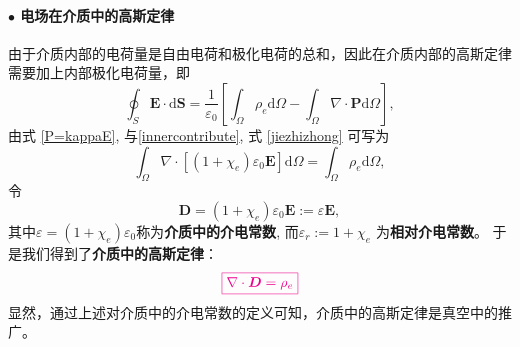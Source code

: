 \documentclass[10pt,reqno, final]{ctexart}
\begin{document}
\paragraph{$\bullet$ 电场在介质中的高斯定律} 由于介质内部的电荷量是自由电荷和极化电荷的总和，因此在介质内部的高斯定律需要加上内部极化电荷量，即
\begin{equation}\label{jiezhizhong}
\oint_S \bm{E}\cdot \mathrm{d}\bm{S} = \frac{1}{\varepsilon_0}\left[ \int_\Omega \rho_e \mathrm{d}\Omega-\int_\Omega \nabla\cdot\bm{P} \mathrm{d}\Omega \right],
\end{equation} 
由式 	\eqref{P=kappaE}, 与\eqref{innercontribute}, 式	\eqref{jiezhizhong} 可写为
\begin{equation}
\int_{\Omega} \nabla\cdot[(1+\chi_e)\varepsilon_0\bm{E}]\mathrm{d}\Omega = \int_\Omega \rho_e \mathrm{d}\Omega,
\end{equation}
令 
$$\bm{D} = (1+\chi_e)\varepsilon_0\bm{E}:= \varepsilon \bm{E},$$
其中$\varepsilon=(1+\chi_e)\varepsilon_0$称为\textbf{介质中的介电常数}, 而$\varepsilon_r:=1+\chi_e$ 为\textbf{相对介电常数}。
于是我们得到了\textbf{介质中的高斯定律}：
\begin{equation}\label{gaussThmgeneral}
\color{magenta}{\boxed{\nabla\cdot \bm{D} = \rho_e }} 
\end{equation}
显然，通过上述对介质中的介电常数的定义可知，介质中的高斯定律是真空中的推广。





\end{document}
